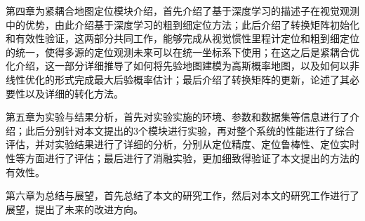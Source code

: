 第四章为紧耦合地图定位模块介绍，首先介绍了基于深度学习的描述子在视觉观测中的优势，由此介绍基于深度学习的粗到细定位方法；此后介绍了转换矩阵初始化和有效性验证，这两部分共同工作，能够完成从视觉惯性里程计定位和粗到细定位的统一，使得多源的定位观测未来可以在统一坐标系下使用；在这之后是紧耦合优化介绍，这一部分详细推导了如何将先验地图建模为高斯概率地图，以及如何以非线性优化的形式完成最大后验概率估计；最后介绍了转换矩阵的更新，论述了其必要性以及详细的转化方法。

第五章为实验与结果分析，首先对实验实施的环境、参数和数据集等信息进行了介绍；此后分别针对本文提出的3个模块进行实验，再对整个系统的性能进行了综合评估，并对实验结果进行了详细的分析，分别从定位精度、定位鲁棒性、定位实时性等方面进行了评估；最后进行了消融实验，更加细致得验证了本文提出的方法的有效性。

第六章为总结与展望，首先总结了本文的研究工作，然后对本文的研究工作进行了展望，提出了未来的改进方向。